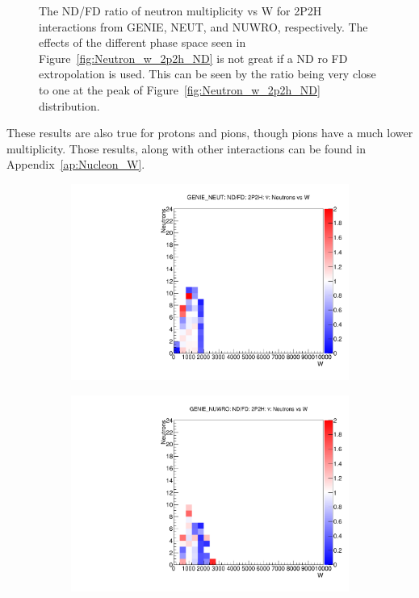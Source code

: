 \documentclass[12pt]{article}
\begin{document}
\begin{figure}
\begin{subfigure}[b]{0.32\textwidth}
\end{subfigure}
\caption{The ND/FD ratio of neutron multiplicity vs W for 2P2H interactions from GENIE, NEUT, and NUWRO, respectively.  The effects of the different phase space seen in Figure~\ref{fig:Neutron_w_2p2h_ND} is not great if a ND ro FD extropolation is used.  This can be seen by the ratio being very close to one at the peak of Figure~\ref{fig:Neutron_w_2p2h_ND} distribution.}
\label{fig:Neutron_w_2p2h_ND_FD}
\end{figure}

These results are also true for protons and pions, though pions have a much lower multiplicity.  
Those results, along with other interactions can be found in Appendix~\ref{ap:Nucleon_W}.

\begin{figure}
\centering
\begin{subfigure}[b]{0.32\textwidth}
  \includegraphics[width=\textwidth]{nneutrons_w/Nneutrons_W_nuc_rest_2p2h_GENIE_NEUT_ND_FD_numu_norm.pdf}
\end{subfigure}
\begin{subfigure}[b]{0.32\textwidth}
  \includegraphics[width=\textwidth]{nneutrons_w/Nneutrons_W_nuc_rest_2p2h_GENIE_NUWRO_ND_FD_numu_norm.pdf}

\end{subfigure}
\end{figure}
\end{document}
